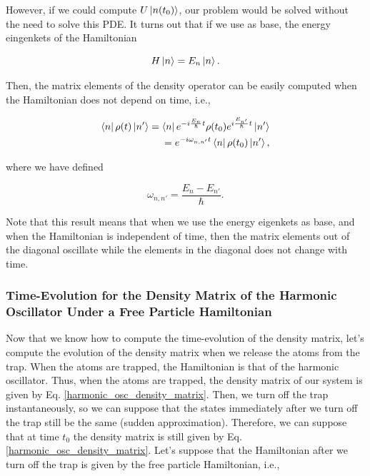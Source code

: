 \documentclass{article}
\begin{document}
However, if we could compute $U \ket{n(t_{0})}$, our problem would be solved without the need to solve this PDE. It turns out that if we use as base, the energy eingenkets of the Hamiltonian

\begin{equation}
    H \ket{n} = E_{n} \ket{n}.
\end{equation}

Then, the matrix elements of the density operator can be easily computed when the Hamiltonian does not depend on time, i.e.,

\begin{equation}\label{time_evol_density_h_independent_time}
   \begin{split}
       \bra{n} \rho(t) \ket{n'} = \bra{n} e^{-i\frac{E_{n}}{\hbar} t} \rho(t_{0}) e^{i\frac{E_{n'}}{\hbar} t} \ket{n'} \\ = e^{-i \omega_{n,n'} t} \bra{n} \rho(t_{0}) \ket{n'},
   \end{split}
\end{equation}

where we have defined

\begin{equation}
    \omega_{n,n'} = \frac{E_{n}-E_{n'}}{\hbar}.
\end{equation}

Note that this result means that when we use the energy eigenkets as base, and when the Hamiltonian is independent of time, then the matrix elements out of the diagonal oscillate while the elements in the diagonal does not change with time.

\subsubsection{Time-Evolution for the Density Matrix of the Harmonic Oscillator Under a Free Particle Hamiltonian}
Now that we know how to compute the time-evolution of the density matrix, let's compute the evolution of the density matrix when we release the atoms from the trap. When the atoms are trapped, the Hamiltonian is that of the harmonic oscillator. Thus, when the atoms are trapped, the density matrix of our system is given by Eq. \ref{harmonic_osc_density_matrix}. Then, we turn off the trap instantaneously, so we can suppose that the states immediately after we turn off the trap still be the same (sudden approximation). Therefore, we can suppose that at time $t_{0}$ the density matrix is still given by Eq. \ref{harmonic_osc_density_matrix}. Let's suppose that the Hamiltonian after we turn off the trap is given by the free particle Hamiltonian, i.e.,
\end{document}

